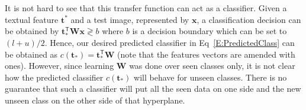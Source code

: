 It is not hard to see that this transfer function can act as a classifier. Given a textual feature $\mathbf{t}^*$ and a test image, represented by $\mathbf{x}$, a classification decision can be obtained by $\mathbf{t}_*^\textsf{T}\mathbf{W}\mathbf{x} \gtrless b$ where $b$ is a decision boundary which can be set to $(l+u)/2$. Hence, our desired predicted classifier in Eq~\ref{E:PredictedClass} can be obtained as $c(\mathbf{t}_*) = \mathbf{t}_*^\textsf{T}\mathbf{W} $ (note that the features vectors are amended with ones).  However, since learning  $\mathbf{W}$ was done over seen classes only, it is not clear how the predicted classifier $c(\mathbf{t}_*)$ will behave for unseen classes. There is no guarantee that such a classifier will put all the seen data on one side and the new unseen class on the other side of that hyperplane. 







%





